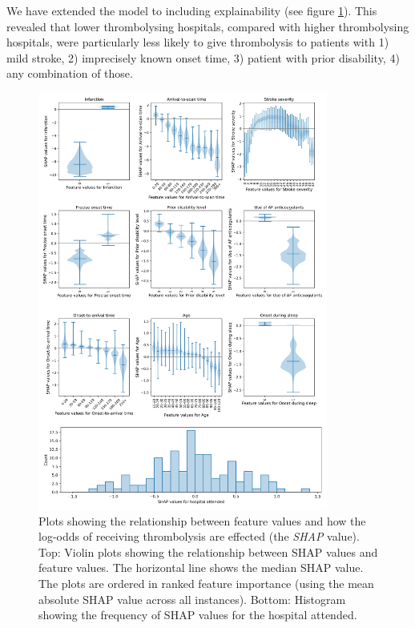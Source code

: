 We have extended the model to including explainability \cite{pearn_what_2023} (see figure \ref{fig:shap}). This revealed that lower thrombolysing hospitals, compared with higher thrombolysing hospitals, were particularly less likely to give thrombolysis to patients with 1) mild stroke, 2) imprecisely known onset time, 3) patient with prior disability, 4) any combination of those.

\begin{figure}
\centering
\includegraphics[width=0.85\textwidth]{./images/combined_shap}
\caption{Plots showing the relationship between feature values and how the log-odds of receiving thrombolysis are effected (the \textit{SHAP} value). Top: Violin plots showing the relationship between SHAP values and feature values. The horizontal line shows the median SHAP value. The plots are ordered in ranked feature importance (using the mean absolute SHAP value across all instances). Bottom: Histogram showing the frequency of SHAP values for the hospital attended.}
\label{fig:shap}
\end{figure}

